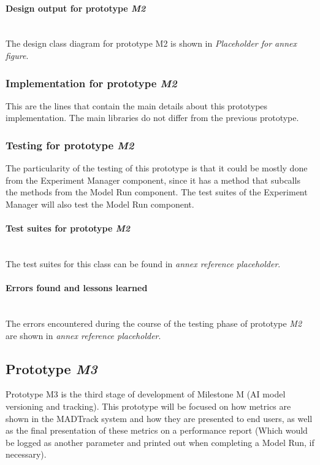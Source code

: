 \paragraph{Design output for prototype \emph{M2}}\mbox{}\\

The design class diagram for prototype M2 is shown in \emph{Placeholder for annex figure}.

\subsubsection{Implementation for prototype \emph{M2}}

This are the lines that contain the main details about this prototypes implementation. The main libraries do not differ from
the previous prototype.

\subsubsection{Testing for prototype \emph{M2}}

The particularity of the testing of this prototype is that it could be mostly done from the Experiment Manager component, since it has a method that subcalls the methods
from the Model Run component. The test suites of the Experiment Manager will also test the Model Run component.

\paragraph{Test suites for prototype \emph{M2}}\mbox{}\\

The test suites for this class can be found in \emph{annex reference placeholder}.

\paragraph{Errors found and lessons learned}\mbox{}\\

The errors encountered during the course of the testing phase of prototype \emph{M2} are shown in \emph{annex reference placeholder}.

\subsection{Prototype \emph{M3}}

Prototype M3 is the third stage of development of Milestone M (AI model versioning and tracking). This prototype will be focused on how metrics are shown in the
MADTrack system and how they are presented to end users, as well as the final presentation of these metrics on a performance report (Which would be logged as 
another parameter and printed out when completing a Model Run, if necessary).


